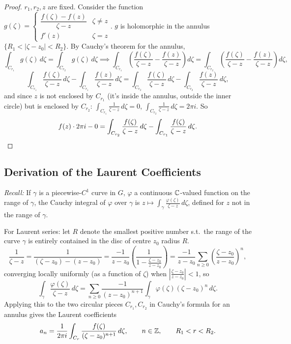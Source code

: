 \documentclass[11pt]{article}
\begin{document}
\begin{proof}
$r_1,r_2,z$ are fixed. Consider the function $g(\zeta) = \begin{cases} \dfrac{f(\zeta)-f(z)}{\zeta-z} & \zeta\ne z \\ f'(z) & \zeta=z\end{cases}$. $g$ is holomorphic in the annulus $\{R_1<|\zeta-z_0|<R_2\}$. By Cauchy's theorem for the annulus,
\[
\int_{C_{r_1}} g(\zeta)\,d\zeta = \int_{C_{r_2}} g(\zeta)\,d\zeta \implies \int_{C_{r_1}} \left(\frac{f(\zeta)}{\zeta-z} - \frac{f(z)}{\zeta-z}\right)d\zeta = \int_{C_{r_2}}\left(\frac{f(\zeta)}{\zeta-z}-\frac{f(z)}{\zeta-z}\right)d\zeta,
\]
\[
\int_{C_{r_1}} \frac{f(\zeta)}{\zeta-z}\,d\zeta - \int_{C_{r_1}} \frac{f(z)}{\zeta-z}\,d\zeta = \int_{C_{r_2}} \frac{f(\zeta)}{\zeta-z}\,d\zeta - \int_{C_{r_2}} \frac{f(z)}{\zeta-z}\,d\zeta,
\]
and since $z$ is not enclosed by $C_{r_1}$ (it's inside the annulus, outside the inner circle) but is enclosed by $C_{r_2}$: $\int_{C_{r_1}}\frac{1}{\zeta-z}\,d\zeta=0$, $\int_{C_{r_2}}\frac{1}{\zeta-z}\,d\zeta=2\pi i$. So
\[
f(z)\cdot2\pi i - 0 = \int_{C_{r_2}} \frac{f(\zeta)}{\zeta-z}\,d\zeta - \int_{C_{r_1}} \frac{f(\zeta)}{\zeta-z}\,d\zeta. \qedhere
\]
\end{proof}

\subsection{Derivation of the Laurent Coefficients}

\emph{Recall:} If $\gamma$ is a piecewise-$C^1$ curve in $G$, $\varphi$ a continuous ${\mathbb{C}}$-valued function on the range of $\gamma$, the Cauchy integral of $\varphi$ over $\gamma$ is $z \mapsto \int_\gamma \frac{\varphi(\zeta)}{\zeta-z}\,d\zeta$, defined for $z$ not in the range of $\gamma$.

For Laurent series: let $R$ denote the smallest positive number s.t.\ the range of the curve $\gamma$ is entirely contained in the disc of centre $z_0$ radius $R$.
\[
\frac{1}{\zeta-z} = \frac{1}{(\zeta-z_0)-(z-z_0)} = \frac{-1}{z-z_0}\left(\frac{1}{1-\frac{\zeta-z_0}{z-z_0}}\right) = \frac{-1}{z-z_0}\sum_{n\ge0}\left(\frac{\zeta-z_0}{z-z_0}\right)^n,
\]
converging locally uniformly (as a function of $\zeta$) when $\left|\frac{\zeta-z_0}{z-z_0}\right|<1$, so
\[
\int_\gamma \frac{\varphi(\zeta)}{\zeta-z}\,d\zeta = \sum_{n\ge0} \frac{-1}{(z-z_0)^{n+1}} \int_\gamma \varphi(\zeta)(\zeta-z_0)^n\,d\zeta.
\]
Applying this to the two circular pieces $C_{r_1},C_{r_2}$ in Cauchy's formula for an annulus gives the Laurent coefficients
\[
a_n = \frac{1}{2\pi i}\int_{C_r} \frac{f(\zeta)}{(\zeta-z_0)^{n+1}}\,d\zeta, \qquad n \in {\mathbb{Z}}, \qquad R_1<r<R_2.
\]
\end{document}
